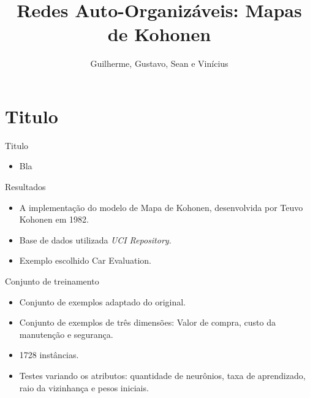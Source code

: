 \documentclass{beamer}
\title{Redes Auto-Organizáveis: Mapas de Kohonen}
\author{Guilherme, Gustavo, Sean e Vinícius}
\institute{Universidade Estadual de Londrina}
\begin{document}
\frame{\titlepage}



\section{Titulo}

\begin{frame}{Titulo}

	\begin{itemize}
	  \item Bla
	\end{itemize}
\end{frame}

\begin{frame}{Resultados}
	\begin{itemize}
	  \item A implementação do modelo de Mapa de Kohonen, desenvolvida por Teuvo Kohonen em 1982.
	  \item Base de dados utilizada \textit{UCI Repository}.
	  \item Exemplo escolhido Car Evaluation.
	\end{itemize}
\end{frame}

\begin{frame}{Conjunto de treinamento}
	\begin{itemize}
	  \item Conjunto de exemplos adaptado do original. 
	  \item Conjunto de exemplos de três dimensões: Valor de compra, custo da manutenção e segurança.
	  \item 1728 instâncias.
	  \item Testes variando os atributos: quantidade de neurônios, taxa de aprendizado, raio da vizinhança e pesos iniciais.
	\end{itemize}
\end{frame}
\end{document}
